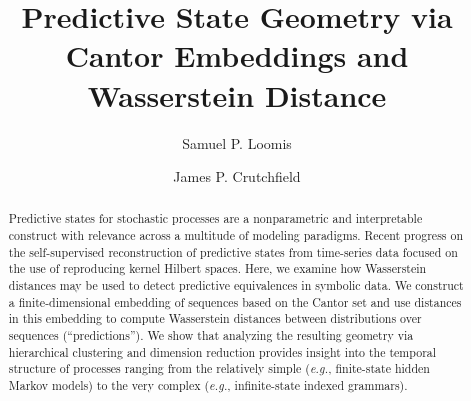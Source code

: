 \documentclass[sigconf, anonymous, review]{acmart}
\begin{document}
\title{Predictive State Geometry via Cantor Embeddings and Wasserstein Distance}
\author{Samuel P. Loomis}

\author{James P. Crutchfield}

\renewcommand{\shortauthors}{Loomis and Crutchfield}

\begin{abstract}
  Predictive states for stochastic processes are a nonparametric and
  interpretable construct with relevance across a multitude of modeling
  paradigms. Recent progress on the self-supervised reconstruction of predictive
  states from time-series data focused on the use of reproducing kernel
  Hilbert spaces. Here, we examine how Wasserstein distances may be used to
  detect predictive equivalences in symbolic data. We construct a
  finite-dimensional embedding of sequences based on the Cantor set and use
  distances in this embedding to compute Wasserstein distances between
  distributions over sequences (``predictions''). We show that analyzing the
  resulting geometry via hierarchical clustering and dimension reduction
  provides insight into the temporal structure of processes ranging from the
  relatively simple (\emph{e.g.}, finite-state hidden Markov models) to the
  very complex (\emph{e.g.}, infinite-state indexed grammars).
\end{abstract}
\end{document}
